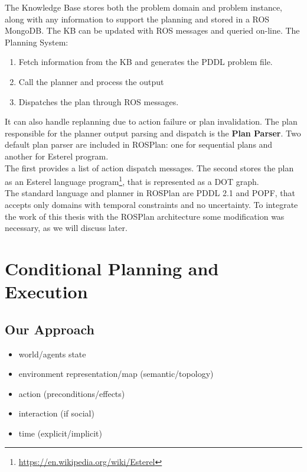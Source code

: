 \documentclass[pdftex,12pt,a4paper]{report}
\begin{document}
\noindent The Knowledge Base stores both the problem domain and problem instance, along with any information to support the planning and stored in a ROS MongoDB. The KB can be updated with ROS messages and queried on-line.
\newpage
\noindent The Planning System:
\begin{enumerate}
\item Fetch information from the KB and generates the PDDL problem file.
\item Call the planner and process the output
\item Dispatches the plan through ROS messages.
\end{enumerate}  
It can also handle replanning due to action failure or plan invalidation. The plan responsible for the planner output parsing and dispatch is the \textbf{Plan Parser}. Two default plan parser are included in ROSPlan: one for sequential plans and another for Esterel program. \\
The first provides a list of action dispatch messages. The second stores the plan as an Esterel language program\footnote{\url{https://en.wikipedia.org/wiki/Esterel}}, that is represented as a DOT graph. \\

\noindent The standard language and planner in ROSPlan are PDDL 2.1 and POPF\cite{coles2010forward},%
that accepts only domains with temporal constraints and no uncertainty. To integrate the work of this thesis with the ROSPlan architecture some modification was necessary, as we will discuss later.

\chapter{Conditional Planning and Execution}
\section{Our Approach}
\label{sec:approach}

\begin{itemize}
\item world/agents state
\item environment representation/map (semantic/topology)
\item action (preconditions/effects)
\item interaction (if social)
\item time (explicit/implicit)
\end{itemize}
\end{document}
